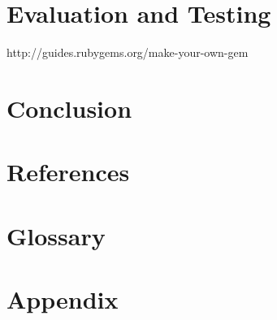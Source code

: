 \documentclass{article}
\begin{document}
\newpage
\section{Evaluation and Testing}
http://guides.rubygems.org/make-your-own-gem
\newpage
\section{Conclusion}

\newpage
\section{References}


\renewcommand{\bibname}{}

\newpage
\section{Glossary}
\printglossary
\newpage
\section{Appendix}
\end{document}
